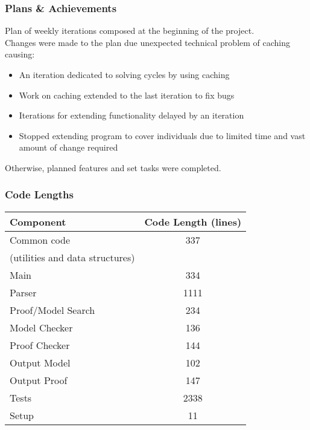 \begin{frame}
  \frametitle{Plans \& Achievements}
Plan of weekly iterations composed at the beginning of the project.\\
\bigskip
Changes were made to the plan due unexpected technical problem of caching causing:
\begin{itemize}
\item An iteration dedicated to solving cycles by using caching
\item Work on caching extended to the last iteration to fix bugs
\item Iterations for extending functionality delayed by an iteration
\item Stopped extending program to cover individuals due to limited time and vast amount of change required
\end{itemize}
\bigskip
Otherwise, planned features and set tasks were completed.
\end{frame}

\begin{frame}
  \frametitle{Code Lengths}
\begin{center}
  \begin{tabular}{|l|c|}
\hline
\textbf{Component} & \textbf{Code Length (lines)} \\
\hline
Common code & 337\\
(utilities and data structures) & \\
\hline
Main & 334\\
\hline
Parser & 1111\\
\hline
Proof/Model Search & 234\\
\hline
Model Checker & 136\\
\hline
Proof Checker & 144\\
\hline
Output Model & 102\\
\hline
Output Proof & 147\\
\hline
Tests & 2338\\
\hline
Setup & 11\\
\hline
\end{tabular}
\end{center}
\end{frame}